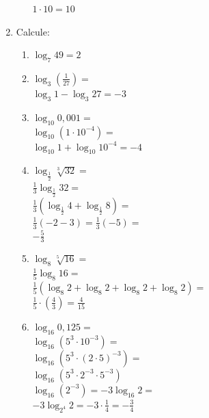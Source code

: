 \documentclass[a4paper, 12pt]{article}
\begin{document}
\begin{enumerate}
\begin{enumerate}
    $ 1 \cdot 10 = 10 $ 
  \end{enumerate}
\item Calcule:
  \begin{enumerate}
  \item $ \log_7 49 = 2 $ \\
  \item $ \log_3 \left ( \frac{1}{27} \right ) = $ \\
    $ \log_3 1 - \log_3 27 = -3 $ \\
  \item $ \log_{10} 0,001 = $ \\
    $ \log_{10} \left ( 1 \cdot 10^{-4} \right ) =  $ \\
    $  \log_{10} 1 + \log_{10} 10^{-4} = -4 $ \\
  \item $ \log_{\frac{1}{2}} \sqrt[3]{32} = $ \\
    $ \frac{1}{3} \log_{\frac{1}{2}} 32 = $ \\
    $ \frac{1}{3} \left ( \log_{\frac{1}{2}} 4 + \log_{\frac{1}{2}} 8 \right ) = $ \\
    $ \frac{1}{3} \left ( -2 -3 \right ) = \frac{1}{3} \left ( -5 \right ) = $ \\
    $ -\frac{5}{3} $ \\
  \item $ \log_8 \sqrt[5]{16} = $ \\
    $ \frac{1}{5} \log_{8} 16 = $ \\
    $ \frac{1}{5} \left ( \log_8 2 +  \log_8 2  +  \log_8 2 +  \log_8 2  \right ) = $ \\
    $ \frac{1}{5} \cdot \left ( \frac{4}{3} \right ) = \frac{4}{15} $ \\
  \item $ \log_{16} 0,125 = $ \\
    $ \log_{16} \left ( 5^3 \cdot 10^{-3} \right ) = $ \\
    $ \log_{16} \left ( 5^3 \cdot \left ( 2 \cdot 5 \right )^{-3} \right ) = $ \\
    $ \log_{16} \left ( 5^3 \cdot 2^{-3} \cdot 5^{-3} \right ) $ \\ 
    $ \log_{16} \left ( 2^{-3} \right ) = -3 \log_{16} 2 = $ \\
    $ -3 \log_{2^4} 2 = -3 \cdot \frac{1}{4} = -\frac{3}{4} $
  \end{enumerate}
\end{enumerate}
\end{document}

